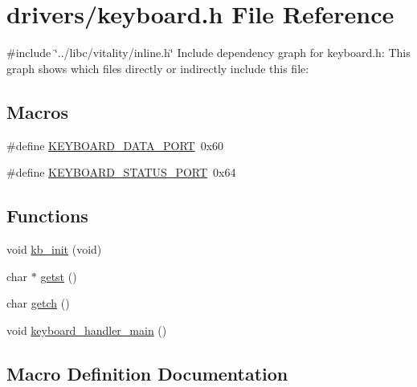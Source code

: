 \hypertarget{a00032}{}\section{drivers/keyboard.h File Reference}
\label{a00032}
{\ttfamily \#include \char`\"{}../libc/vitality/inline.\+h\char`\"{}}\newline
Include dependency graph for keyboard.\+h\+:
This graph shows which files directly or indirectly include this file\+:
\subsection*{Macros}
\begin{DoxyCompactItemize}
\item 
\#define \hyperlink{a00032_a49e0a04e81098085d2948c1e9f8c99cb_a49e0a04e81098085d2948c1e9f8c99cb}{K\+E\+Y\+B\+O\+A\+R\+D\+\_\+\+D\+A\+T\+A\+\_\+\+P\+O\+RT}~0x60
\item 
\#define \hyperlink{a00032_ab79ca089665bc7f5cc151883d1bc69ed_ab79ca089665bc7f5cc151883d1bc69ed}{K\+E\+Y\+B\+O\+A\+R\+D\+\_\+\+S\+T\+A\+T\+U\+S\+\_\+\+P\+O\+RT}~0x64
\end{DoxyCompactItemize}
\subsection*{Functions}
\begin{DoxyCompactItemize}
\item 
void \hyperlink{a00032_aabdb223e5290f3b3c07bc82d075b87d7_aabdb223e5290f3b3c07bc82d075b87d7}{kb\+\_\+init} (void)
\item 
char $\ast$ \hyperlink{a00032_ab88a2e96bbe585e228a5b201435c0240_ab88a2e96bbe585e228a5b201435c0240}{getst} ()
\item 
char \hyperlink{a00032_af3facad10e05defa48d45b46eb9ebe7e_af3facad10e05defa48d45b46eb9ebe7e}{getch} ()
\item 
void \hyperlink{a00032_adffe6abc4a32b3b10985ec9324bce2af_adffe6abc4a32b3b10985ec9324bce2af}{keyboard\+\_\+handler\+\_\+main} ()
\end{DoxyCompactItemize}


\subsection{Macro Definition Documentation}
\mbox{\label{a00032_a49e0a04e81098085d2948c1e9f8c99cb_a49e0a04e81098085d2948c1e9f8c99cb}} 
